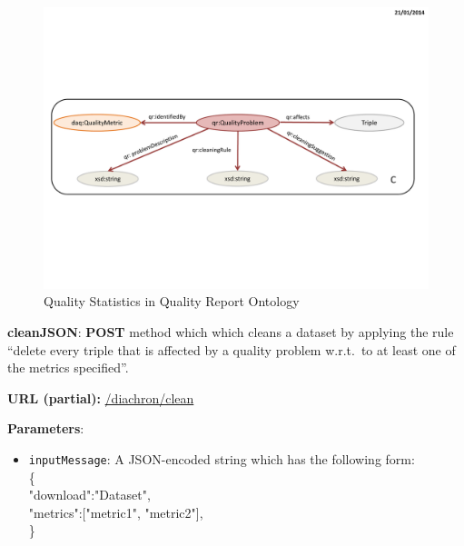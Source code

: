 \begin{description}


\begin{figure}[ht!]
\centering
\includegraphics[page=8,trim=1.0cm 1.0cm 1.0cm 1.0cm,clip,width=\textwidth]{figures/CleaningFigures.pdf}
\caption{Quality Statistics in Quality Report Ontology}
\label{fig:qstat}
\end{figure}

\item{\textbf{cleanJSON}:} \textbf{POST} method which which cleans a dataset by applying the rule ``delete every triple that is affected by a quality problem w.r.t.\ to at least one of the metrics specified''.

\textbf{URL (partial):} \url{/diachron/clean} 

\textbf{Parameters}: 
\begin{itemize}
\item \texttt{inputMessage}: A JSON-encoded string which has the following form: \\
\{ \\
\hspace*{0.5 cm}"download":"Dataset", \\
\hspace*{0.5 cm}"metrics":["metric1", "metric2"], \\ 
\} \\



\end{itemize}
\end{description}
